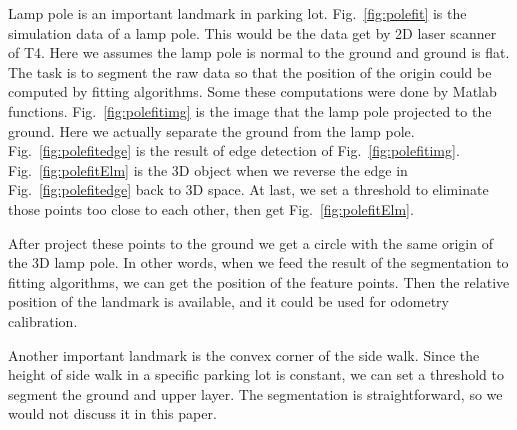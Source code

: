 \documentclass{cdcarta4}
\begin{document}
Lamp pole is an important landmark in parking lot. Fig.~\ref{fig:polefit} is the simulation
data of a lamp pole. This would be the data get by 2D laser scanner of T4. Here we assumes the lamp pole is normal to the ground and ground is flat. The task is to segment the raw data so
that the position of the origin could be computed by fitting algorithms. Some these computations were done by Matlab functions. Fig.~\ref{fig:polefitimg} is the image that the lamp pole projected to the ground. Here we actually separate the ground from the lamp pole. Fig.~\ref{fig:polefitedge} is the result of edge detection of Fig.~\ref{fig:polefitimg}. Fig.~\ref{fig:polefitElm} is the 3D object when we reverse the edge in Fig.~\ref{fig:polefitedge} back to 3D space. At last, we set a threshold to eliminate those points too close to each other, then get Fig.~\ref{fig:polefitElm}. 

After project these points to the ground we get a circle with the same origin of the 3D lamp pole. In other words, when we feed the result of the segmentation to fitting algorithms, we can get the position of the feature points. Then the relative position of the landmark is available, and it could be used for odometry calibration. 

Another important landmark is the convex corner of the side walk. Since the height of side walk in a specific parking lot is constant, we can set a threshold to segment the ground and upper layer. The segmentation is straightforward, so we would not discuss it in this paper. 
\end{document}
